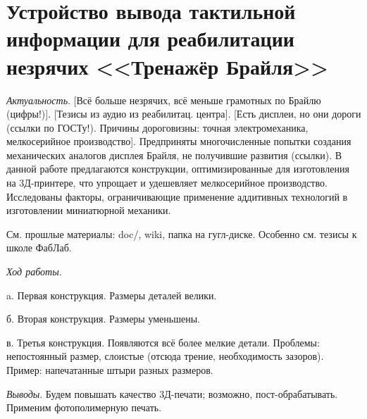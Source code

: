 \documentclass[a4paper,12pt]{article} %
\begin{document}
	
\section{Устройство вывода тактильной информации для реабилитации незрячих <<Тренажёр Брайля>>}

\textit{Актуальность}.
[Всё больше незрячих, всё меньше грамотных по Брайлю (цифры!)]. 
[Тезисы из аудио из реабилитац. центра].
[Есть дисплеи, но они дороги (ссылки по ГОСТу!). Причины дороговизны: точная электромеханика, мелкосерийное производство].
Предприняты многочисленные попытки создания механических аналогов дисплея Брайля, не получившие развития (ссылки). В данной работе предлагаются конструкции, оптимизированные для изготовления на 3Д-принтере, что упрощает и удешевляет мелкосерийное производство. Исследованы факторы, ограничивающие применение аддитивных технологий в изготовлении миниатюрной механики.

См. прошлые материалы: doc/, wiki, папка на гугл-диске. Особенно см. тезисы к школе ФабЛаб.

\textit{Ход работы}.

a. Первая конструкция. Размеры деталей велики.

б. Вторая конструкция. Размеры уменьшены.

в. Третья конструкция. Появляются всё более мелкие детали.
Проблемы: непостоянный размер, слоистые (отсюда трение, необходимость зазоров).
Пример: напечатанные штыри разных размеров.

\textit{Выводы}.
Будем повышать качество 3Д-печати; возможно, пост-обрабатывать. Применим фотополимерную печать.
\end{document}
